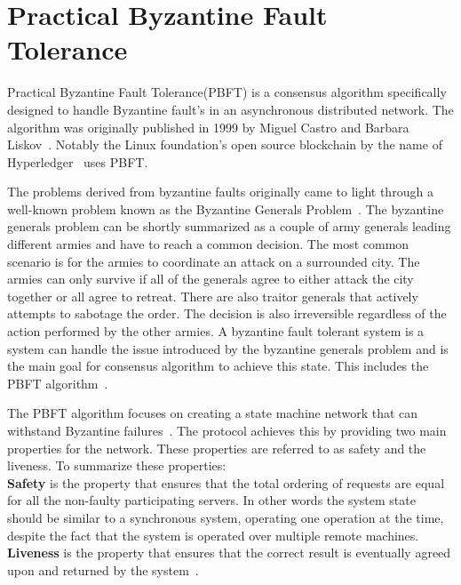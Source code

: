 \chapter{Practical Byzantine Fault Tolerance}
\label{chapter:PBFT}

Practical Byzantine Fault Tolerance(PBFT) is a consensus algorithm specifically designed to handle Byzantine fault's in an asynchronous distributed network. The algorithm was originally published in 1999 by Miguel Castro and Barbara Liskov~\cite{PAPER:OGPBFT}.
Notably the Linux foundation's open source blockchain by the name of Hyperledger~\cite{WEB:PBFTGeeks, SLIDES:PBFT} uses PBFT.

The problems derived from byzantine faults originally came to light through a well-known problem known as the Byzantine Generals Problem~\cites{WEB:BFTInfo}{ART:lamportByzGenProb}[p.~240-253]{BOOK:BuildDepDistSyst}.
The byzantine generals problem can be shortly summarized as a couple of army generals leading different armies and have to reach a common decision. The most common scenario is for the armies to coordinate an attack on a surrounded city. The armies can only survive if all of the generals agree to either attack the city together or all agree to retreat. There are also traitor generals that actively attempts to sabotage the order. The decision is also irreversible regardless of the action performed by the other armies. A byzantine fault tolerant system is a system can handle the issue introduced by the byzantine generals problem and is the main goal for consensus algorithm to achieve this state. This includes the PBFT algorithm~\cite{WEB:BFTInfo, ART:lamportByzGenProb}.

The PBFT algorithm focuses on creating a state machine network that can withstand Byzantine failures~\cite[p.~456]{BOOK:MVstandver3}. The protocol achieves this by providing two main properties for the network. These properties are referred to as safety and the liveness.
To summarize these properties:\\
\textbf{Safety} is the property that ensures that the total ordering of requests are equal for all the non-faulty participating servers. In other words the system state should be similar to a synchronous system, operating one operation at the time, despite the fact that the system is operated over multiple remote machines.\\ 
\textbf{Liveness} is the property that ensures that the correct result is eventually agreed upon and returned by the system~\cites[p~456]{BOOK:MVstandver3}{WEB:ConsesAlgo}[p.~2]{PAPER:OGPBFT}{SLIDES:PBFT}[p.~403]{PAPER:PBFTRecovery}[p.~257]{BOOK:BuildDepDistSyst}.

